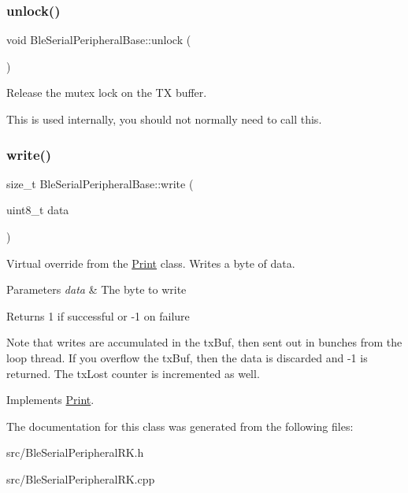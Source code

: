 \subsubsection{\texorpdfstring{unlock()}{unlock()}}
{\footnotesize\ttfamily void Ble\+Serial\+Peripheral\+Base\+::unlock (\begin{DoxyParamCaption}{ }\end{DoxyParamCaption})}



Release the mutex lock on the TX buffer. 

This is used internally, you should not normally need to call this. \mbox{\label{class_ble_serial_peripheral_base_ac041322685f26d921f60d01a2ed99e83}} 
\subsubsection{\texorpdfstring{write()}{write()}}
{\footnotesize\ttfamily size\+\_\+t Ble\+Serial\+Peripheral\+Base\+::write (\begin{DoxyParamCaption}\item[{uint8\+\_\+t}]{data }\end{DoxyParamCaption})\hspace{0.3cm}{\ttfamily [virtual]}}



Virtual override from the \mbox{\hyperlink{class_print}{Print}} class. Writes a byte of data. 


\begin{DoxyParams}{Parameters}
{\em data} & The byte to write \\
\hline
\end{DoxyParams}
\begin{DoxyReturn}{Returns}
1 if successful or -\/1 on failure
\end{DoxyReturn}
Note that writes are accumulated in the tx\+Buf, then sent out in bunches from the loop thread. If you overflow the tx\+Buf, then the data is discarded and -\/1 is returned. The tx\+Lost counter is incremented as well. 

Implements \mbox{\hyperlink{class_print_ab9195b97274029f693aaddce6c7a0021}{Print}}.



The documentation for this class was generated from the following files\+:\begin{DoxyCompactItemize}
\item 
src/Ble\+Serial\+Peripheral\+R\+K.\+h\item 
src/Ble\+Serial\+Peripheral\+R\+K.\+cpp\end{DoxyCompactItemize}

